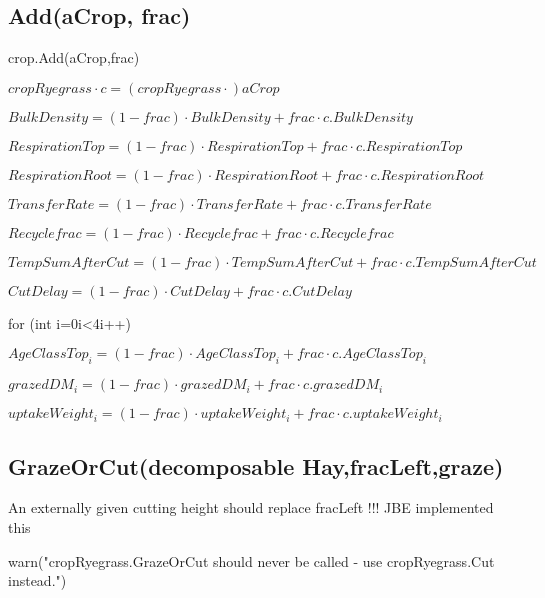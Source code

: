 \documentclass[%
]{scrartcl}
\begin{document}
\subsection{Add(aCrop, frac)}

   crop.Add(aCrop,frac)

  $ cropRyegrass  \cdot  c = (cropRyegrass \cdot )aCrop$

  $ BulkDensity            =(1-frac) \cdot BulkDensity + frac \cdot c.BulkDensity$
  
 $RespirationTop         =(1-frac) \cdot RespirationTop + frac \cdot c.RespirationTop$

  $ RespirationRoot        =(1-frac) \cdot RespirationRoot + frac \cdot c.RespirationRoot$

  $ TransferRate           =(1-frac) \cdot TransferRate + frac \cdot c.TransferRate$

   $Recyclefrac        =(1-frac) \cdot Recyclefrac + frac \cdot c.Recyclefrac$

   $TempSumAfterCut =(1-frac) \cdot TempSumAfterCut + frac \cdot c.TempSumAfterCut$

  $ CutDelay               =(1-frac) \cdot CutDelay + frac \cdot c.CutDelay$
 
  for (int i=0i<4i++)

\quad       $AgeClassTop_i=(1-frac) \cdot AgeClassTop_i+frac \cdot c.AgeClassTop_i$

\quad 	   $grazedDM_i=(1-frac) \cdot grazedDM_i+frac \cdot c.grazedDM_i$

 \quad     $ uptakeWeight_i     = (1-frac) \cdot uptakeWeight_i+frac \cdot c.uptakeWeight_i$
   








\subsection{GrazeOrCut(decomposable Hay,fracLeft,graze)}

\citep[Eq. 12]{berntsen2005simulation}

An externally given cutting height should replace fracLeft !!!
JBE implemented this 

   warn("cropRyegrass.GrazeOrCut should never be called - use cropRyegrass.Cut instead.")
  
\end{document}
